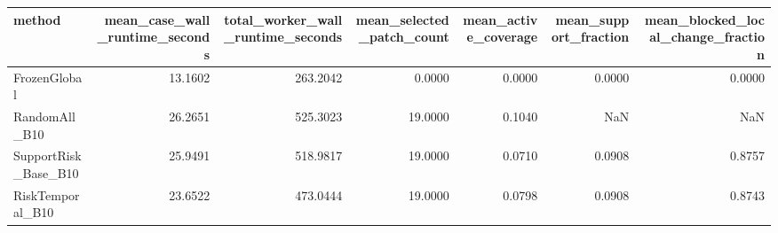 \begin{tabular}{lrrrrrr}
\toprule
method & mean\_case\_wall\_runtime\_seconds & total\_worker\_wall\_runtime\_seconds & mean\_selected\_patch\_count & mean\_active\_coverage & mean\_support\_fraction & mean\_blocked\_local\_change\_fraction \\
\midrule
FrozenGlobal & 13.1602 & 263.2042 & 0.0000 & 0.0000 & 0.0000 & 0.0000 \\
RandomAll\_B10 & 26.2651 & 525.3023 & 19.0000 & 0.1040 & NaN & NaN \\
SupportRisk\_Base\_B10 & 25.9491 & 518.9817 & 19.0000 & 0.0710 & 0.0908 & 0.8757 \\
RiskTemporal\_B10 & 23.6522 & 473.0444 & 19.0000 & 0.0798 & 0.0908 & 0.8743 \\
\bottomrule
\end{tabular}
